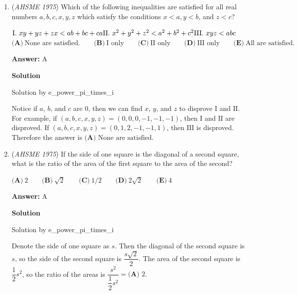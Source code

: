 \begin{enumerate}
 If $m = 1$, however, the lines will have equations $y = x + 3$ and $y = x + 4$.  These lines have the same slope but different $y$-intercepts, so they are parallel and thus the system has no solutions.  

 Therefore, the system has at least one solution if and only if $\boxed{\textbf{(D) }m\neq 1}$.

 -j314andrews

 


	\item (\textit{AHSME 1975}) Which of the following inequalities are satisfied for all real numbers $a, b, c, x, y, z$ which satisfy the conditions $x < a, y < b$, and $z < c$? 


 $\text{I}. \ xy + yz + zx < ab + bc + ca \\ \text{II}. \ x^2 + y^2 + z^2 < a^2 + b^2 + c^2 \\ \text{III}. \ xyz < abc$
$\textbf{(A)}\ \text{None are satisfied.} \qquad  \textbf{(B)}\ \text{I only} \qquad  \textbf{(C)}\ \text{II only} \qquad  \textbf{(D)}\ \text{III only} \qquad  \textbf{(E)}\ \text{All are satisfied.}$

 \textbf{Answer: }A



\textbf{Solution}

Solution by e\_power\_pi\_times\_i

 
Notice if $a$, $b$, and $c$ are $0$, then we can find $x$, $y$, and $z$ to disprove $\text{I}$ and $\text{II}$. For example, if $(a, b, c, x, y, z) = (0, 0, 0, -1, -1, -1)$, then $\text{I}$ and $\text{II}$ are disproved. If $(a, b, c, x, y, z) = (0, 1, 2, -1, -1, 1)$, then $\text{III}$ is disproved. Therefore the answer is $\boxed{\textbf{(A) } \text{None are satisfied}}$.

 


	\item (\textit{AHSME 1975}) If the side of one square is the diagonal of a second square, what is the ratio of the area of the first square to the area of the second? 


 $\textbf{(A)}\ 2 \qquad  \textbf{(B)}\ \sqrt2 \qquad  \textbf{(C)}\ 1/2 \qquad  \textbf{(D)}\ 2\sqrt2 \qquad  \textbf{(E)}\ 4$

 \textbf{Answer: }A



\textbf{Solution}

Solution by e\_power\_pi\_times\_i

 
Denote the side of one square as $s$. Then the diagonal of the second square is $s$, so the side of the second square is $\dfrac{s\sqrt{2}}{2}$. The area of the second square is $\dfrac{1}{2}s^2$, so the ratio of the areas is $\dfrac{s^2}{\dfrac{1}{2}s^2} = \boxed{\textbf{(A) } 2}$.


\end{enumerate}
